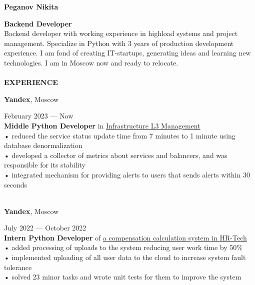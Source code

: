 \documentclass{article}
\begin{document}
\begin{vwcol}[widths={0.8,0.2},
 sep=.8cm, justify=flush,rule=0pt,indent=1em] 
\begin{spacing}{1.1}
\noindent\textbf{\Huge{Peganov Nikita}}\\
\end{spacing}
\noindent\textcolor[rgb]{0.1255,0.2902,0.7843}{\textbf{\Large{Backend Developer}}}\\
Backend developer with working experience in highload systems and project management. Specialize in Python with 3 years of production development experience. I am fond of creating IT-startups, generating ideas and learning new technologies. I am in Moscow now and ready to relocate.\\
\\
\noindent\textcolor[rgb]{0.1255,0.2902,0.7843}{\textbf{\Large{EXPERIENCE}}}\\
\begin{Large}
\textbf{Yandex}, Moscow
\end{Large}
\hspace{215pt}February 2023 — Now\\
\textbf{Middle Python Developer} in \href{https://infraevents.yandex.ru/}{Infrastructure L3 Management}\\
• reduced the service status update time from 7 minutes to 1 minute using database denormalization\\
• developed a collector of metrics about services and balancers, and was responsible for its stability\\
• integrated mechanism for providing alerts to users that sends alerts within 30 seconds\\
\\
\begin{Large}
\textbf{Yandex}, Moscow
\end{Large}
\hspace{200pt}July 2022 — October 2022\\
\textbf{Intern Python Developer} of \href{https://yandex.cloud/ru/isv/hrtech}{a compensation calculation system in HR-Tech}\\
• added processing of uploads to the system reducing user work time by 50\%\\
• implemented uploading of all user data to the cloud to increase system fault tolerance\\
• solved 23 minor tasks and wrote unit tests for them to improve the system\\
\\

\end{vwcol}
\end{document}
